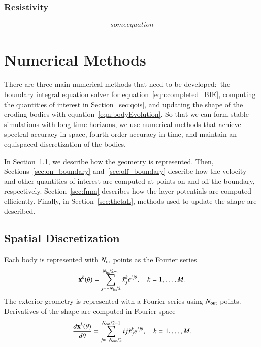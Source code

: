 \documentclass[preprint, 10pt]{elsarticle}
\begin{document}
\subsubsection{Resistivity}
\begin{align}
  some equation
  \label{eqn:resistivity}
\end{align}



\section{Numerical Methods\label{s:method}} 
There are three main numerical methods that need to be developed:~the
boundary integral equation solver for
equation~\eqref{eqn:completed_BIE}, computing the quantities of interest
in Section~\ref{sec:qois}, and updating the shape of the eroding bodies
with equation~\eqref{eqn:bodyEvolution}.  So that we can form stable
simulations with long time horizons, we use numerical methods that
achieve spectral accuracy in space, fourth-order accuracy in time, and
maintain an equispaced discretization of the bodies.

In Section~\ref{sec:spatial_discretization}, we describe how the
geometry is represented.  Then, Sections~\ref{sec:on_boundary}
and~\ref{sec:off_boundary} describe how the velocity and other
quantities of interest are computed at points on and off the boundary,
respectively.  Section~\ref{sec:fmm} describes how the layer potentials
are computed efficiently.  Finally, in Section~\ref{sec:thetaL}, methods
used to update the shape are described.


\subsection{Spatial Discretization}
\label{sec:spatial_discretization}
Each body is represented with $N_{\mathrm{in}}$ points as the Fourier series
\begin{align*}
  {\mathbf{x}}^k(\theta) = \sum_{j = -N_{\mathrm{in}} /2}^{N_{\mathrm{in}} /2-1} \hat{x}_j^k e^{ij\theta},
    \quad k=1,\ldots,M.
\end{align*}
The exterior geometry is represented with a Fourier series using
$N_{\mathrm{out}}$ points.  Derivatives of the shape are computed in Fourier space
\begin{align*}
  \frac{d{\mathbf{x}}^k(\theta)}{d\theta} = 
    \sum_{j = -N_{\mathrm{out}} /2}^{N_{\mathrm{out}} /2-1} ij\hat{x}_j^k e^{ij\theta},
    \quad k=1,\ldots,M.
\end{align*}
\end{document}
